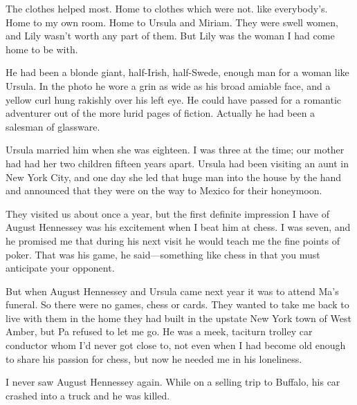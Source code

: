 \documentclass{novel}
\begin{document}
The clothes helped most. Home to clothes which were not. like everybody’s. Home to my own room. Home to Ursula and Miriam. They were swell women, and Lily wasn’t worth any part of them. But Lily was the woman I had come home to be with.

\vspace{2\nbs}
\clearpage
\thispagestyle{empty}


\begin{ChapterStart}
\vspace{3\nbs}
\end{ChapterStart}

He had been a blonde giant, half-Irish, half-Swede, enough man for a woman like Ursula. In the photo he wore a grin as wide as his broad amiable face, and a yellow curl hung rakishly over his left eye. He could have passed for a romantic adventurer out of the more lurid pages of fiction. Actually he had been a salesman of glassware.

Ursula married him when she was eighteen. I was three at the time; our mother had had her two children fifteen years apart. Ursula had been visiting an aunt in New York City, and one day she led that huge man into the house by the hand and announced that they were on the way to Mexico for their honeymoon.

They visited us about once a year, but the first definite impression I have of August Hennessey was his excitement when I beat him at chess. I was seven, and he promised me that during his next visit he would teach me the fine points of poker. That was his game, he said—something like chess in that you must anticipate your opponent.

But when August Hennessey and Ursula came next year it was to attend Ma’s funeral. So there were no games, chess or cards. They wanted to take me back to live with them in the home they had built in the upstate New York town of West Amber, but Pa refused to let me go. He was a meek, taciturn trolley car conductor whom I’d never got close to, not even when I had become old enough to share his passion for chess, but now he needed me in his loneliness.

I never saw August Hennessey again. While on a selling trip to Buffalo, his car crashed into a truck and he was killed.
\end{document}
